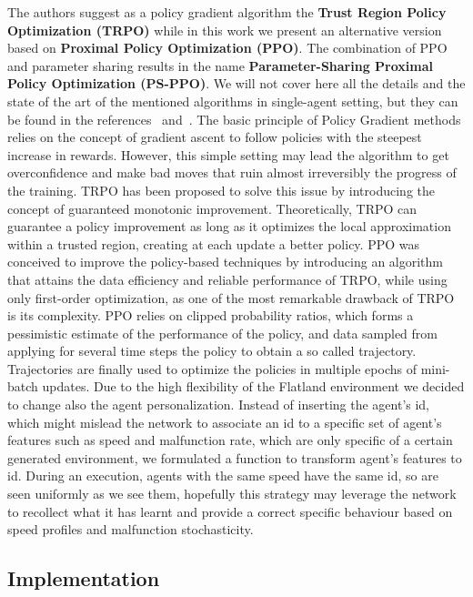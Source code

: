 \documentclass[11pt, a4paper, hidelinks]{report}
\begin{document}
The authors suggest as a policy gradient algorithm the \textbf{Trust Region Policy Optimization (TRPO)} while in this work we present an alternative version based on \textbf{Proximal Policy Optimization (PPO)}.
The combination of PPO and parameter sharing results in the name \textbf{Parameter-Sharing Proximal Policy Optimization (PS-PPO)}.
We will not cover here all the details and the state of the art of the mentioned algorithms in single-agent setting, but they can be found in the references~\citep{trpo} and~\citep{ppo}.
The basic principle of Policy Gradient methods relies on the concept of gradient ascent to follow policies with the steepest increase in rewards.
However, this simple setting may lead the algorithm to get overconfidence and make bad moves that ruin almost irreversibly the progress of the training.
TRPO has been proposed to solve this issue by introducing the concept of guaranteed monotonic improvement.
Theoretically, TRPO can guarantee a policy improvement as long as it optimizes the local approximation within a trusted region, creating at each update a better policy.
PPO was conceived to improve the policy-based techniques by introducing an algorithm that attains the data efficiency and reliable performance of TRPO, while using only first-order optimization, as one of the most remarkable drawback of TRPO is its complexity.
PPO relies on clipped probability ratios, which forms a pessimistic estimate of the performance of the policy, and data sampled from applying for several time steps the policy to obtain a so called trajectory.
Trajectories are finally used to optimize the policies in multiple epochs of mini-batch updates.
Due to the high flexibility of the Flatland environment we decided to change also the agent personalization.
Instead of inserting the agent's id, which might mislead the network to associate an id to a specific set of agent's features such as speed and malfunction rate, which are only specific of a certain generated environment, we formulated a function to transform agent's features to id.
During an execution, agents with the same speed have the same id, so are seen uniformly as we see them, hopefully this strategy may leverage the network to recollect what it has learnt and provide a correct specific behaviour based on speed profiles and malfunction stochasticity.

\subsection{Implementation}\label{subsec:implementation}
\end{document}
